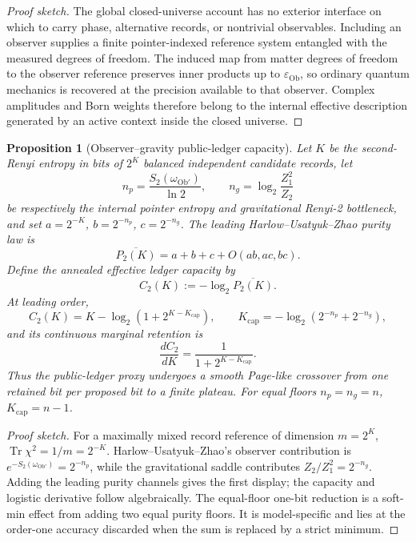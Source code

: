 \documentclass[11pt]{article}
\theoremstyle{plain}
\newtheorem{proposition}[theorem]{Proposition}
\theoremstyle{definition}
\theoremstyle{remark}
\newenvironment{proofsketch}{\begin{proof}[Proof sketch]}{\end{proof}}
\newcommand{\Tr}{\operatorname{Tr}}
\begin{document}
\begin{proofsketch}
The global closed-universe account has no exterior interface on which to carry phase, alternative records, or nontrivial observables. Including an observer supplies a finite pointer-indexed reference system entangled with the measured degrees of freedom. The induced map from matter degrees of freedom to the observer reference preserves inner products up to \(\varepsilon_{\mathrm{Ob}}\), so ordinary quantum mechanics is recovered at the precision available to that observer. Complex amplitudes and Born weights therefore belong to the internal effective description generated by an active context inside the closed universe.
\end{proofsketch}

\begin{proposition}[Observer--gravity public-ledger capacity]
Let \(K\) be the second-Renyi entropy in bits of \(2^K\) balanced independent candidate records, let
\[
n_p=\frac{S_2(\omega_{\mathrm{Ob}'})}{\ln 2},
\qquad
n_g=\log_2\frac{Z_1^2}{Z_2}
\]
be respectively the internal pointer entropy and gravitational Renyi-2 bottleneck, and set \(a=2^{-K}\), \(b=2^{-n_p}\), \(c=2^{-n_g}\). The leading Harlow--Usatyuk--Zhao purity law is
\[
\overline{P_2(K)}
=a+b+c+O(ab,ac,bc).
\]
Define the annealed effective ledger capacity by
\[
C_2(K):=-\log_2\overline{P_2(K)}.
\]
At leading order,
\[
C_2(K)
=K-\log_2\!\left(1+2^{K-K_{\mathrm{cap}}}\right),
\qquad
K_{\mathrm{cap}}
=-\log_2\!\left(2^{-n_p}+2^{-n_g}\right),
\]
and its continuous marginal retention is
\[
\frac{dC_2}{dK}
=\frac{1}{1+2^{K-K_{\mathrm{cap}}}}.
\]
Thus the public-ledger proxy undergoes a smooth Page-like crossover from one retained bit per proposed bit to a finite plateau. For equal floors \(n_p=n_g=n\), \(K_{\mathrm{cap}}=n-1\).
\end{proposition}

\begin{proofsketch}
For a maximally mixed record reference of dimension \(m=2^K\), \(\Tr\chi^2=1/m=2^{-K}\). Harlow--Usatyuk--Zhao's observer contribution is \(e^{-S_2(\omega_{\mathrm{Ob}'})}=2^{-n_p}\), while the gravitational saddle contributes \(Z_2/Z_1^2=2^{-n_g}\). Adding the leading purity channels gives the first display; the capacity and logistic derivative follow algebraically. The equal-floor one-bit reduction is a soft-min effect from adding two equal purity floors. It is model-specific and lies at the order-one accuracy discarded when the sum is replaced by a strict minimum.
\end{proofsketch}
\end{document}
